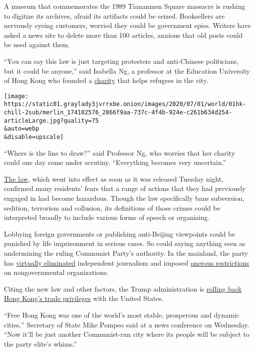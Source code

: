 A museum that commemorates the 1989 Tiananmen Square massacre is rushing
to digitize its archives, afraid its artifacts could be seized.
Booksellers are nervously eyeing customers, worried they could be
government spies. Writers have asked a news site to delete more than 100
articles, anxious that old posts could be used against them.

``You can say this law is just targeting protesters and anti-Chinese
politicians, but it could be anyone,'' said Isabella Ng, a professor at
the Education University of Hong Kong who founded a
\href{https://www.facebookcorewwwi.onion/HKSASR/?ref=page_internal}{charity}
that helps refugees in the city.

\texttt{[image: https://static01.graylady3jvrrxbe.onion/images/2020/07/01/world/01hk-chill-2sub/merlin\_174102576\_2866f9aa-737c-4f4b-924e-c261b634d254-articleLarge.jpg?quality=75\\\&auto=webp\\\&disable=upscale]}

``Where is the line to draw?'' said Professor Ng, who worries that her
charity could one day come under scrutiny. ``Everything becomes very
uncertain.''

\href{http://www.xinhuanet.com/2020-06/30/c_1126179649.htm}{The law},
which went into effect as soon as it was released Tuesday night,
confirmed many residents' fears that a range of actions that they had
previously engaged in had become hazardous. Though the law specifically
bans subversion, sedition, terrorism and collusion, its definitions of
those crimes could be interpreted broadly to include various forms of
speech or organizing.

Lobbying foreign governments or publishing anti-Beijing viewpoints could
be punished by life imprisonment in serious cases. So could saying
anything seen as undermining the ruling Communist Party's authority. In
the mainland, the party has
\href{https://www.nytimes3xbfgragh.onion/2019/07/12/world/asia/china-journalists-crackdown.html}{virtually
eliminated} independent journalism and imposed
\href{https://www.nytimes3xbfgragh.onion/2016/04/29/world/asia/china-foreign-ngo-law.html}{onerous
restrictions} on nongovernmental organizations.

Citing the new law and other factors, the Trump administration is
\href{https://www.nytimes3xbfgragh.onion/2020/05/29/us/politics/trump-hong-kong-china-WHO.html}{rolling
back Hong Kong's trade privileges} with the United States.

``Free Hong Kong was one of the world's most stable, prosperous and
dynamic cities,'' Secretary of State Mike Pompeo said at a news
conference on Wednesday. ``Now it'll be just another Communist-run city
where its people will be subject to the party elite's whims.''

